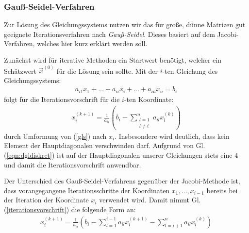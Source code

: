 \documentclass[10pt,a4paper]{article}
\begin{document}
\subsubsection{Gauß-Seidel-Verfahren}
\label{sec:gauss-seidel}
Zur Lösung des Gleichungssystems nutzen wir das für große, dünne Matrizen gut geeignete Iterationsverfahren nach \emph{Gauß-Seidel}. Dieses basiert auf dem Jacobi-Verfahren, welches hier kurz erklärt werden soll.

Zunächst wird für iterative Methoden ein Startwert benötigt, welcher ein Schätzwert $\vec{x}^{(0)}$ für die Lösung sein sollte. Mit der $i$-ten Gleichung des Gleichungssystems:
\begin{align}
\label{gls}
a_{i1} x_{1} + \dots + a_{ii} x_{i} + \dots + a_{in} x_{n} = b_i
\end{align}
folgt für die Iterationsvorschrift für die $i$-ten Koordinate:
\begin{align}
\label{iterationsvorschrift}
x_i^{(k+1)} = \frac{1}{a_{ii}}\left( b_i - \sum^{n}_{\substack{l=1 \\ l \neq i}} a_{il} x_l^{(k)} \right) 
\end{align}
durch Umformung von (\ref{gls}) nach $x_i$. Insbesondere wird deutlich, dass kein Element der Hauptdiagonalen verschwinden darf. Aufgrund von Gl. (\ref{eqn:dgldiskret}) ist auf der Hauptdiagonalen unserer Gleichungen stets eine $\num{4}$ und damit die Iterationsvorschrift anwendbar.

Der Unterschied des Gauß-Seidel-Verfahrens gegenüber der Jacobi-Methode ist, dass vorangegangene Iterationsschritte der Koordinaten $x_1, \dots , x_{i-1}$ bereits bei der Iteration der Koordinate $x_i$ verwendet wird. Damit nimmt Gl. (\ref{iterationsvorschrift}) die folgende Form an:
\begin{align}
x_i^{(k+1)} = \frac{1}{a_{ii}}\left( b_i - \sum^{i-1}_{l=1} a_{il} x_l^{(k+1)} - \sum^{n}_{l=i+1} a_{il} x_l^{(k)} \right) 
\end{align}
\end{document}
